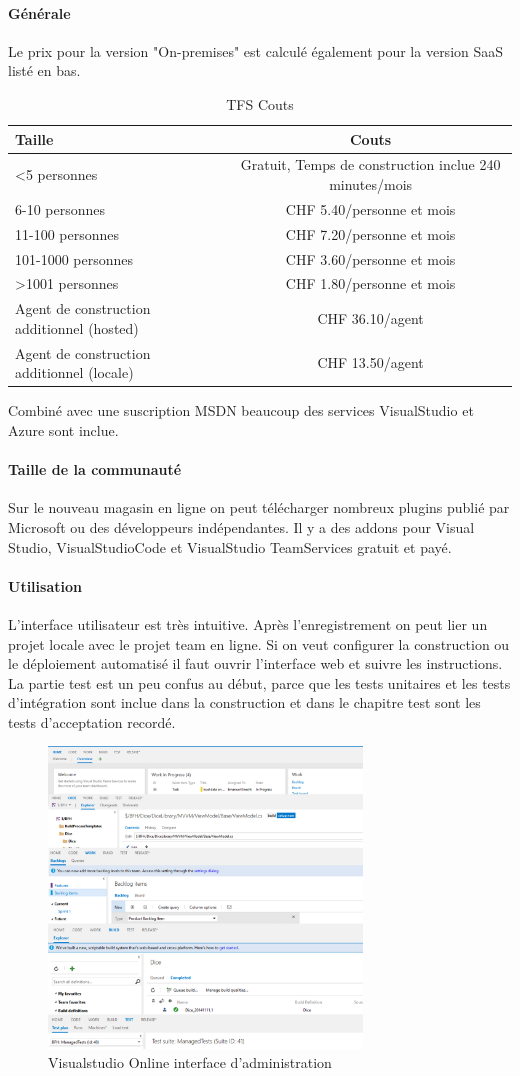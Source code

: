 \paragraph{Générale}  Le prix pour la version "On-premises" est calculé également pour la version SaaS listé en bas.
\begin{table} [H]
	\centering
		\begin{tabular}{l|c} \toprule
			\textbf{Taille} & \textbf{Couts} \\ \midrule
			<5 personnes & Gratuit, Temps de construction inclue 240 minutes/mois \\
			6-10 personnes & CHF 5.40/personne et mois \\
			11-100 personnes & CHF 7.20/personne et mois\\
			101-1000 personnes & CHF 3.60/personne et mois \\
			>1001 personnes & CHF 1.80/personne et mois \\ \midrule
			Agent de construction additionnel (hosted) & CHF 36.10/agent \\
			Agent de construction additionnel (locale) & CHF 13.50/agent \\ \bottomrule
		\end{tabular}
	\caption{TFS Couts}
\end{table}
Combiné avec une suscription MSDN beaucoup des services VisualStudio et Azure sont inclue.
\paragraph{Taille de la communauté} Sur le nouveau magasin en ligne on peut télécharger nombreux plugins publié par Microsoft ou des développeurs indépendantes. Il y a des addons pour Visual Studio, VisualStudioCode et VisualStudio TeamServices gratuit et payé.
\paragraph{Utilisation} L'interface utilisateur est très intuitive. Après l'enregistrement on peut lier un projet locale avec le projet team en ligne. Si on veut configurer la construction ou le déploiement automatisé il faut ouvrir l'interface web et suivre les instructions. 
La partie test est un peu confus au début, parce que les tests unitaires et les tests d'intégration sont inclue dans la construction et dans le chapitre test sont les tests d'acceptation recordé.

\begin{figure}[H]
	\centering
		\includegraphics[height=8cm]{bilder/vso}
	\caption{Visualstudio Online interface d'administration}
	\label{fig:vsogui}
\end{figure}

